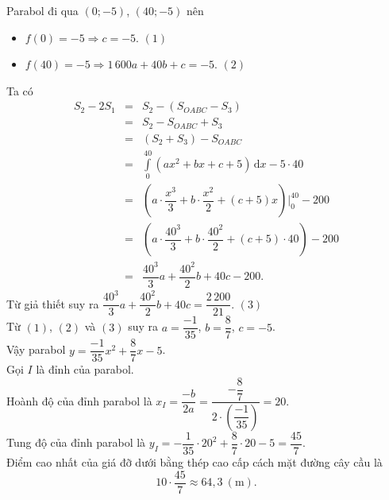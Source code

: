 \begin{ex}
{Parabol đi qua $(0; -5)$, $(40; -5)$ nên
\begin{itemize}
\item  $f(0) = -5 \Rightarrow c = -5$. \hfill $(1)$
\item  $f(40) = -5 \Rightarrow 1\,600a + 40b + c = -5$. \hfill $(2)$
\end{itemize}
Ta có
\begin{eqnarray*}
S_2 - 2S_1 &=& S_2 - (S_{OABC} - S_3)\\
&=& S_2 - S_{OABC} + S_3\\
&=& (S_2 + S_3) - S_{OABC}\\
&=&  \displaystyle\int\limits_{0}^{40} (ax^2 + bx + c + 5) \,\mathrm{d}x -5\cdot40\\
&=& \left( a \cdot \dfrac{x^3}{3} + b \cdot \dfrac{x^2}{2} + (c+5) x \right) \Bigg|_0^{40} - 200\\
&=& \left( a \cdot \dfrac{40^3}{3} + b \cdot \dfrac{40^2}{2} + (c+5) \cdot 40 \right) - 200\\
&=& \dfrac{40^3}{3} a + \dfrac{40^2}{2} b + 40c - 200.
\end{eqnarray*}
Từ giả thiết suy ra
$\dfrac{40^3}{3} a + \dfrac{40^2}{2} b + 40c = \dfrac{2\,200}{21}$. \hfill $(3)$\\
Từ $(1)$, $(2)$ và $(3)$ suy ra
$a = \dfrac{-1}{35}$, $b = \dfrac{8}{7}$, $c= -5
$.\\
Vậy parabol $y = \dfrac{-1}{35} x^2 + \dfrac{8}{7} x - 5$.\\
Gọi $I$ là đỉnh của parabol.\\
Hoành độ của đỉnh parabol là $x_I = \dfrac{-b}{2a} = \dfrac{-\dfrac{8}{7}}{2 \cdot \left(\dfrac{-1}{35}\right)} = 20$.\\
Tung độ của đỉnh parabol là $y_I=-\dfrac{1}{35} \cdot 20^2+\dfrac{8}{7} \cdot 20-5=\dfrac{45}{7}$.\\
Điểm cao nhất của giá đỡ dưới bằng thép cao cấp cách mặt đường cây cầu là
\[10 \cdot \dfrac{45}{7} \approx 64{,}3\ (\text{m}).\]
}
\end{ex}

